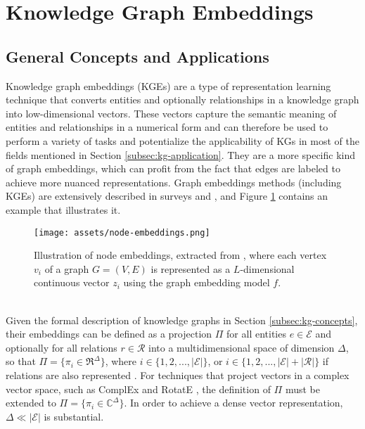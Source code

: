 \documentclass[11pt,titlepage,oneside,openany]{book}
\begin{document}
\section{Knowledge Graph Embeddings}
\label{sec:kge}

\subsection{General Concepts and Applications}
\label{subsec:kge-overview}

Knowledge graph embeddings (KGEs) are a type of representation learning technique that converts entities and optionally relationships in a knowledge graph into low-dimensional vectors. These vectors capture the semantic meaning of entities and relationships in a numerical form and can therefore be used to perform a variety of tasks and potentialize the applicability of KGs in most of the fields mentioned in Section \ref{subsec:kg-application}. They are a more specific kind of graph embeddings, which can profit from the fact that edges are labeled to achieve more nuanced representations. Graph embeddings methods (including KGEs) are extensively described in surveys \cite{cai_comprehensive_2018} and \cite{xu_understanding_2020}, and Figure \ref{fig:node-embeddings} contains an example that illustrates it.\\
\begin{figure}[h!]
    \centering
    \centerline{\texttt{[image: assets/node-embeddings.png]}}
    \caption{Illustration of node embeddings, extracted from \cite{xu_understanding_2020}, where each vertex $v_i$ of a graph $G=(V, E)$ is represented as a $L$-dimensional continuous vector $z_i$ using the graph embedding model $f$.}
    \label{fig:node-embeddings}
\end{figure}
\\
Given the formal description of knowledge graphs in Section \ref{subsec:kg-concepts}, their embeddings can be defined as a projection $\Pi$ for all entities $e \in \mathcal{E}$ and optionally for all relations $r \in \mathcal{R}$ into a multidimensional space of dimension $\Delta$, so that $\Pi = \{\pi_i \in \Re^\Delta\}$, where $i \in \{1, 2, ..., |\mathcal{E}|\}$, or $i \in \{1, 2, ..., |\mathcal{E}| + |\mathcal{R}|\}$ if relations are also represented \cite{portisch_rdf2vec_2023}. For techniques that project vectors in a complex vector space, such as ComplEx \cite{trouillon_complex_2016} and RotatE \cite{sun_rotate_2019}, the definition of $\Pi$ must be extended to $\Pi = \{\pi_i \in \mathbb{C}^\Delta\}$. In order to achieve a dense vector representation, $\Delta \ll |\mathcal{E}|$ is substantial.\\
\end{document}
